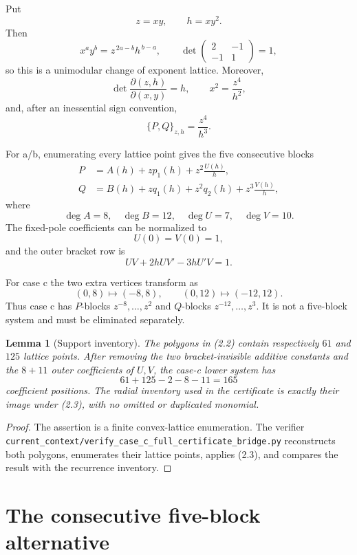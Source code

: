 \documentclass[11pt]{article}
\newtheorem{lemma}[theorem]{Lemma}
\theoremstyle{definition}
\theoremstyle{remark}
\begin{document}
Put
\[
   z=xy,\qquad h=xy^2.
\]
Then
\[
   x^ay^b=z^{\,2a-b}h^{\,b-a},\qquad
   \det\begin{pmatrix}2&-1\\-1&1\end{pmatrix}=1, \tag{2.3}
\]
so this is a unimodular change of exponent lattice.  Moreover,
\[
 \det\frac{\partial(z,h)}{\partial(x,y)}=h,\qquad
 x^2=\frac{z^4}{h^2},
\]
and, after an inessential sign convention,
\[
   \{P,Q\}_{z,h}=\frac{z^4}{h^3}. \tag{2.4}
\]

For a/b, enumerating every lattice point gives the five consecutive
blocks
\[
\begin{aligned}
P&=A(h)+zp_1(h)+z^2\frac{U(h)}h,\\
Q&=B(h)+zq_1(h)+z^2q_2(h)+z^3\frac{V(h)}h,             \tag{2.5}
\end{aligned}
\]
where
\[
\deg A=8,\quad \deg B=12,\quad \deg U=7,\quad \deg V=10.
\]
The fixed-pole coefficients can be normalized to
\[
 U(0)=V(0)=1,
\]
and the outer bracket row is
\[
 UV+2hUV'-3hU'V=1.                                   \tag{2.6}
\]

For case c the two extra vertices transform as
\[
 (0,8)\longmapsto(-8,8),\qquad
 (0,12)\longmapsto(-12,12).                           \tag{2.7}
\]
Thus case c has \(P\)-blocks \(z^{-8},\ldots,z^2\) and \(Q\)-blocks
\(z^{-12},\ldots,z^3\).  It is not a five-block system and must be
eliminated separately.

\begin{lemma}[Support inventory]\label{lem:support}
The polygons in (2.2) contain respectively \(61\) and \(125\) lattice
points.  After removing the two bracket-invisible additive constants and
the \(8+11\) outer coefficients of \(U,V\), the case-c lower system has
\[
  61+125-2-8-11=165
\]
coefficient positions.  The radial inventory used in the certificate is
exactly their image under (2.3), with no omitted or duplicated monomial.
\end{lemma}

\begin{proof}
The assertion is a finite convex-lattice enumeration.  The verifier
\texttt{current\_context/verify\_case\_c\_full\_certificate\_bridge.py}
reconstructs both polygons, enumerates their lattice points, applies
(2.3), and compares the result with the recurrence inventory.
\end{proof}

\section{The consecutive five-block alternative}\label{sec:fiveblock}
\end{document}
